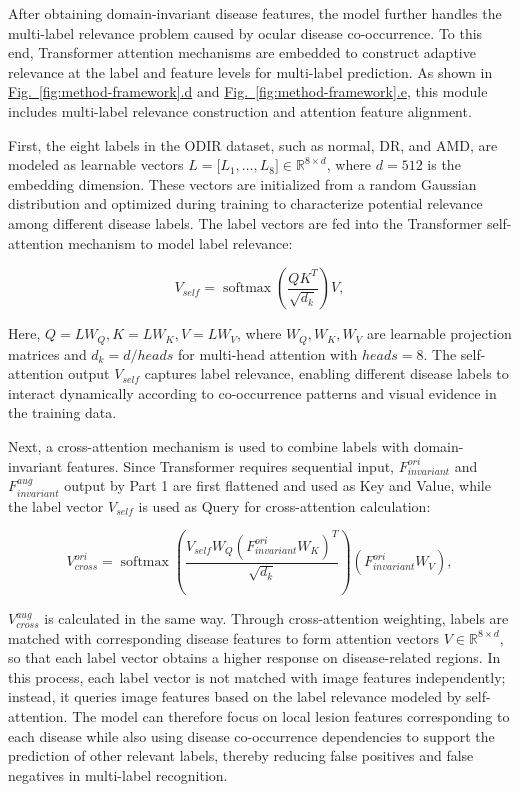 
After obtaining domain-invariant disease features, the model further handles the multi-label relevance problem caused by ocular disease co-occurrence. To this end, Transformer attention mechanisms are embedded to construct adaptive relevance at the label and feature levels for multi-label prediction. As shown in \hyperref[fig:method-framework]{Fig.~\ref*{fig:method-framework}.d} and \hyperref[fig:method-framework]{Fig.~\ref*{fig:method-framework}.e}, this module includes multi-label relevance construction and attention feature alignment.

First, the eight labels in the ODIR dataset, such as normal, DR, and AMD, are modeled as learnable vectors \(L = \lbrack L_{1},\ldots,L_{8}\rbrack \in \mathbb{R}^{8 \times d}\), where \(d = 512\) is the embedding dimension. These vectors are initialized from a random Gaussian distribution and optimized during training to characterize potential relevance among different disease labels. The label vectors are fed into the Transformer self-attention mechanism to model label relevance:

\begin{equation}\label{eq:self-attention}
V_{self} = \operatorname{softmax}\left(\frac{QK^{T}}{\sqrt{d_{k}}}\right)V,
\end{equation}

Here, \(Q = LW_{Q},K = LW_{K},V = LW_{V}\), where \(W_{Q},W_{K},W_{V}\) are learnable projection matrices and \(d_{k} = d/heads\) for multi-head attention with \(heads=8\). The self-attention output \(V_{self}\) captures label relevance, enabling different disease labels to interact dynamically according to co-occurrence patterns and visual evidence in the training data.

Next, a cross-attention mechanism is used to combine labels with domain-invariant features. Since Transformer requires sequential input, \(F_{invariant}^{ori}\) and \(F_{invariant}^{aug}\) output by Part 1 are first flattened and used as Key and Value, while the label vector \(V_{self}\) is used as Query for cross-attention calculation:

\begin{equation}\label{eq:cross-attention}
V_{cross}^{ori} = \operatorname{softmax}\left(\frac{V_{self}W_{Q}(F_{invariant}^{ori}W_{K})^{T}}{\sqrt{d_{k}}}\right)(F_{invariant}^{ori}W_{V}),
\end{equation}

\(V_{cross}^{aug}\) is calculated in the same way. Through cross-attention weighting, labels are matched with corresponding disease features to form attention vectors \(V \in \mathbb{R}^{8 \times d}\), so that each label vector obtains a higher response on disease-related regions. In this process, each label vector is not matched with image features independently; instead, it queries image features based on the label relevance modeled by self-attention. The model can therefore focus on local lesion features corresponding to each disease while also using disease co-occurrence dependencies to support the prediction of other relevant labels, thereby reducing false positives and false negatives in multi-label recognition.

